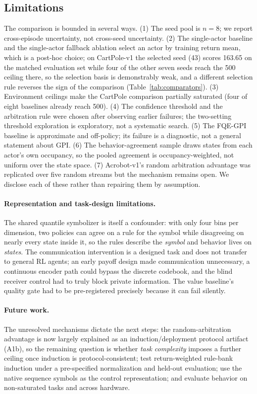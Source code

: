 \documentclass[11pt]{article}
\begin{document}
\subsection{Limitations}
\label{sec:discussion:limitations}

The comparison is bounded in several ways. (1) The seed pool is $n=8$; we report cross-episode
uncertainty, not cross-seed uncertainty. (2) The single-actor baseline and the single-actor
fallback ablation select an actor by training return mean, which is a post-hoc choice; on
CartPole-v1 the selected seed (43) scores 163.65 on the matched evaluation set while four of the other
seven seeds reach the
500 ceiling there, so the selection basis is demonstrably weak,
and a different selection rule reverses the sign of the comparison
(Table~\ref{tab:comparators}). (3) Environment ceilings make
the CartPole comparison partially saturated (four of eight baselines already reach 500). (4) The
confidence threshold and the arbitration rule were chosen after observing earlier failures; the
two-setting threshold exploration is exploratory, not a systematic search. (5) The FQE-GPI baseline
is approximate and off-policy; its failure is a diagnostic, not a general statement about GPI.
(6) The behavior-agreement sample draws states from each actor's own occupancy, so the pooled
agreement is occupancy-weighted, not uniform over the state space. (7) Acrobot-v1's random
arbitration advantage was replicated over five random streams but the mechanism remains open.
We disclose each of these rather than repairing them by assumption.

\paragraph{Representation and task-design limitations.}
The shared quantile symbolizer is itself a confounder: with only four bins per dimension, two policies
can agree on a rule for the symbol while disagreeing on nearly every state inside it, so the rules
describe the \emph{symbol} and behavior lives on \emph{states}. The communication intervention is a
designed task and does not transfer to general RL agents; an early payoff design made communication
unnecessary, a continuous encoder path could bypass the discrete codebook, and the blind receiver
control had to truly block private information. The value baseline's quality gate had to be pre-registered
precisely because it can fail silently.

\paragraph{Future work.}
The unresolved mechanisms dictate the next steps: the random-arbitration advantage is now largely
explained as an induction/deployment protocol artifact (A1b), so the remaining question is whether
\emph{task complexity} imposes a further ceiling once induction is protocol-consistent; test
return-weighted rule-bank induction under a pre-specified normalization and held-out evaluation; use the
native sequence symbols as the control representation; and evaluate behavior on non-saturated tasks and
across hardware.
\end{document}
